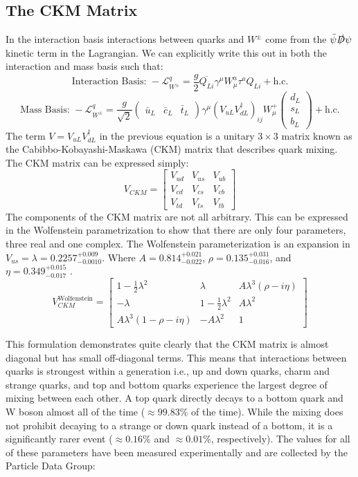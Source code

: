\subsection{The CKM Matrix}
\label{sec:CKM}
In the interaction basis interactions between quarks and $W^\pm$ come from the $\bar{\psi}\slashed{D}\psi$ kinetic term in the Lagrangian.  We can explicitly write this out in both the interaction and mass basis such that:
\[\text{Interaction Basis: } -\mathcal{L}^q_{W^\pm} =\frac{g}{2}\overline{Q_{Li}}\gamma^{\mu}W_{\mu}^a\tau^a Q_{Li} +\text{h.c.}\]
\[\text{Mass Basis: } -\mathcal{L}^q_{W^\pm} =\frac{g}{\sqrt{2}}\begin{pmatrix}\bar{u}_L &\bar{c}_L &\bar{t}_L\end{pmatrix}\gamma^\mu (V_{uL}V_{dL}^{\dagger})_{ij}W_{\mu}^+ \begin{pmatrix} d_L \\s_L \\b_L\end{pmatrix}+\text{h.c.} \]
The term $V=V_{uL}V_{dL}^{\dagger}$ in the previous equation is a unitary $3\times3$ matrix known as the Cabibbo-Kobayashi-Maskawa (CKM) matrix \cite{CKM1,CKM2} that describes quark mixing.  The CKM matrix can be expressed simply:
\[
V_{CKM} = 
\begin{bmatrix}
V_{ud} & V_{us} & V_{ub} \\
V_{cd} & V_{cs} & V_{cb} \\
V_{td} & V_{ts} & V_{tb}
\end{bmatrix}
\]
The components of the CKM matrix are not all arbitrary.  This can be expressed in the Wolfenstein parametrization\cite{Wolfenstein} to show that there are only four parameters, three real and one complex.  The Wolfenstein parameterization is an expansion in $V_{us}=\lambda= 0.2257^{+0.009}_{-0.0010}$. Where $A=0.814^{+0.021}_{-0.022}$, $\rho=0.135^{+0.031}_{-0.016}$, and $\eta = 0.349^{+0.015}_{-0.017}$ \cite{PDG2018}.
\[
V_{CKM}^\text{Wolfenstein} = 
\begin{bmatrix}
1-\frac{1}{2}\lambda^2 	& \lambda			  & A \lambda^3(\rho - i \eta) \\
-\lambda 			& 1-\frac{1}{2}\lambda^2	  & A\lambda^2 \\
A\lambda^3(1-\rho -i\eta) & -A \lambda^2		 & 1
\end{bmatrix}
\]

This formulation demonstrates quite clearly that the CKM matrix is almost diagonal but has small off-diagonal terms.  This means that interactions between quarks is strongest within a generation i.e., up and down quarks, charm and strange quarks, and top and bottom quarks experience the largest degree of mixing between each other.  A top quark directly decays to a bottom quark and W boson almost all of the time ($\approx 99.83\%$ of the time).  While the mixing does not prohibit decaying to a strange or down quark instead of a bottom, it is a significantly rarer event ($\approx 0.16\%$ and $\approx 0.01\%$, respectively).  The values for all of these parameters have been measured experimentally and are collected by the Particle Data Group\cite{PDG2018}: 

